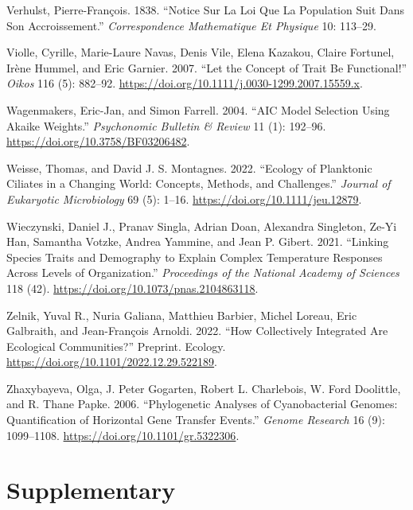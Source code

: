 \documentclass[
  letterpaper,
  DIV=11,
  numbers=noendperiod]{scrartcl}
\newlength{\cslhangindent}
\newenvironment{CSLReferences}[2] %
 {\begin{list}{}{%
  \setlength{\itemindent}{0pt}
  \setlength{\leftmargin}{0pt}
  \setlength{\parsep}{0pt}
  \ifodd #1
   \setlength{\leftmargin}{\cslhangindent}
   \setlength{\itemindent}{-1\cslhangindent}
  \fi
  \setlength{\itemsep}{#2\baselineskip}}}
 {\end{list}}
\begin{document}
\begin{CSLReferences}{1}{0}
Verhulst, Pierre-François. 1838. {``Notice Sur La Loi Que La Population
Suit Dans Son Accroissement.''} \emph{Correspondence Mathematique Et
Physique} 10: 113--29.

Violle, Cyrille, Marie-Laure Navas, Denis Vile, Elena Kazakou, Claire
Fortunel, Irène Hummel, and Eric Garnier. 2007. {``Let the Concept of
Trait Be Functional!''} \emph{Oikos} 116 (5): 882--92.
\url{https://doi.org/10.1111/j.0030-1299.2007.15559.x}.

Wagenmakers, Eric-Jan, and Simon Farrell. 2004. {``{AIC} Model Selection
Using {Akaike} Weights.''} \emph{Psychonomic Bulletin \& Review} 11 (1):
192--96. \url{https://doi.org/10.3758/BF03206482}.

Weisse, Thomas, and David J. S. Montagnes. 2022. {``Ecology of
Planktonic Ciliates in a Changing World: {Concepts}, Methods, and
Challenges.''} \emph{Journal of Eukaryotic Microbiology} 69 (5): 1--16.
\url{https://doi.org/10.1111/jeu.12879}.

Wieczynski, Daniel J., Pranav Singla, Adrian Doan, Alexandra Singleton,
Ze-Yi Han, Samantha Votzke, Andrea Yammine, and Jean P. Gibert. 2021.
{``Linking Species Traits and Demography to Explain Complex Temperature
Responses Across Levels of Organization.''} \emph{Proceedings of the
National Academy of Sciences} 118 (42).
\url{https://doi.org/10.1073/pnas.2104863118}.

Zelnik, Yuval R., Nuria Galiana, Matthieu Barbier, Michel Loreau, Eric
Galbraith, and Jean-François Arnoldi. 2022. {``How Collectively
Integrated Are Ecological Communities?''} Preprint. {Ecology}.
\url{https://doi.org/10.1101/2022.12.29.522189}.

Zhaxybayeva, Olga, J. Peter Gogarten, Robert L. Charlebois, W. Ford
Doolittle, and R. Thane Papke. 2006. {``Phylogenetic Analyses of
Cyanobacterial Genomes: {Quantification} of Horizontal Gene Transfer
Events.''} \emph{Genome Research} 16 (9): 1099--1108.
\url{https://doi.org/10.1101/gr.5322306}.

\end{CSLReferences}

\newpage{}

\section{Supplementary}\label{supplementary}
\end{document}

